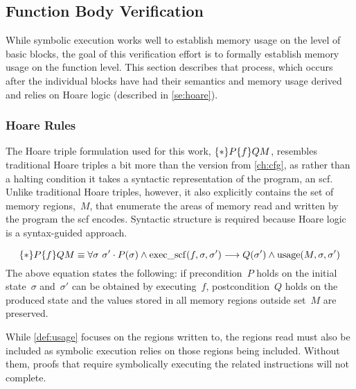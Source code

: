 \subsection{Function Body Verification}
While symbolic execution works well to establish memory usage on the level of basic blocks,
the goal of this verification effort is to formally establish memory usage
on the function level. This section describes that process,
which occurs after the individual blocks have had their semantics and memory usage derived
and relies on Hoare logic (described in \cref{se:hoare}).

\subsubsection{Hoare Rules}\label{scf_hoare}
The Hoare triple formulation used for this work, $\{*\}P\{f\}{Q}M$,
resembles traditional Hoare triples a bit more than the version from \cref{ch:cfg},%
as rather than a halting condition
it takes a syntactic representation of the program, an \ac{scf}.
Unlike traditional Hoare triples, however,
it also explicitly contains the set of memory regions,~$M$,
that enumerate the areas of memory read and written by the program
the \ac{scf} encodes.
Syntactic structure is required because Hoare logic is a syntax-guided approach.
\begin{definition}\label{def:usage}
  \begin{equation}
    \{*\}P\{f\}{Q}{M}\equiv
    \forall\sigma~\sigma'\cdot P(\sigma)\wedge\operatorname{exec\_scf}(f,\sigma,\sigma')\longrightarrow
    Q(\sigma')\wedge\operatorname{usage}(M,\sigma,\sigma')
  \end{equation}
  The above equation states the following:
  if precondition~$P$ holds on the initial state~$\sigma$
  and~$\sigma'$ can be obtained by executing~$f$,
  postcondition~$Q$ holds on the produced state
  and the values stored in all memory regions outside set~$M$ are preserved.
\end{definition}
\begin{example}
\end{example}
While \cref{def:usage} focuses on the regions written to,
the regions read must also be included as symbolic execution
relies on those regions being included.
Without them, proofs that require symbolically executing
the related instructions will not complete.
